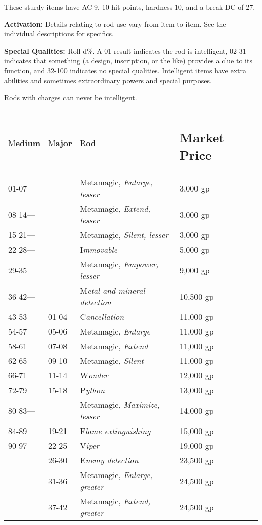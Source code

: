 \documentclass{article}
\begin{document}
These sturdy items have AC 9, 10 hit points, hardness 10, and a break DC of 27.

\textbf{Activation:} Details relating to rod use vary from item to item. See the 
individual descriptions for specifics.

\textbf{Special Qualities:} Roll d\%. A 01 result indicates the rod is intelligent, 
02-31 indicates that something (a design, inscription, or the like) provides a 
clue to its function, and 32-100 indicates no special qualities. Intelligent items 
have extra abilities and sometimes extraordinary powers and special purposes.

Rods with charges can never be intelligent.

\begin{tabular}{|>{\raggedright}p{40pt}|>{\raggedright}p{31pt}|>{\raggedright}p{127pt}|>{\raggedright}p{60pt}|}
\hline
\multicolumn{4}{|p{259pt}|}{T\textbf{able: Rods}}\tabularnewline
\hline
M\textbf{edium} & M\textbf{ajor} & R\textbf{od} & \subsection*{M{\small{}\textbf{arket 
Price}}}\tabularnewline
\hline
01-07--- &  & Metamagic, \textit{Enlarge, lesser} & 3,000 gp\tabularnewline
\hline
08-14--- &  & Metamagic, \textit{Extend, lesser} & 3,000 gp\tabularnewline
\hline
15-21--- &  & Metamagic, \textit{Silent, lesser} & 3,000 gp\tabularnewline
\hline
22-28--- &  & I\textit{mmovable} & 5,000 gp\tabularnewline
\hline
29-35--- &  & Metamagic, \textit{Empower, lesser} & 9,000 gp\tabularnewline
\hline
36-42--- &  & M\textit{etal and mineral detection} & 10,500 gp\tabularnewline
\hline
43-53 & 01-04 & C\textit{ancellation} & 11,000 gp\tabularnewline
\hline
54-57 & 05-06 & Metamagic, \textit{Enlarge} & 11,000 gp\tabularnewline
\hline
58-61 & 07-08 & Metamagic, \textit{Extend} & 11,000 gp\tabularnewline
\hline
62-65 & 09-10 & Metamagic, \textit{Silent} & 11,000 gp\tabularnewline
\hline
66-71 & 11-14 & W\textit{onder} & 12,000 gp\tabularnewline
\hline
72-79 & 15-18 & P\textit{ython} & 13,000 gp\tabularnewline
\hline
80-83--- &  & Metamagic, \textit{Maximize, lesser} & 14,000 gp\tabularnewline
\hline
84-89 & 19-21 & F\textit{lame extinguishing} & 15,000 gp\tabularnewline
\hline
90-97 & 22-25 & V\textit{iper} & 19,000 gp\tabularnewline
\hline
--- & 26-30 & E\textit{nemy detection} & 23,500 gp\tabularnewline
\hline
--- & 31-36 & Metamagic, \textit{Enlarge, greater} & 24,500 gp\tabularnewline
\hline
--- & 37-42 & Metamagic, \textit{Extend, greater} & 24,500 gp\tabularnewline

\end{tabular}
\end{document}
